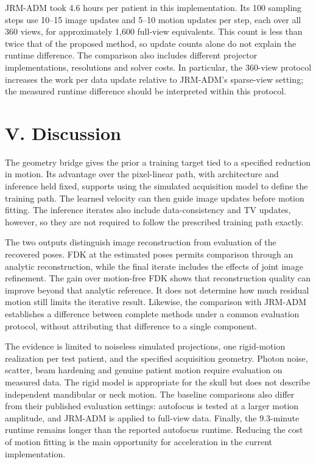 \documentclass[11pt]{article}
\begin{document}
JRM-ADM took 4.6 hours per patient in this implementation. Its 100 sampling steps
use 10--15 image updates and 5--10 motion updates per step, each over all 360 views,
for approximately 1,600 full-view equivalents. This count is less than twice that of
the proposed method, so update counts alone do not explain the runtime difference.
The comparison also includes different projector implementations, resolutions and
solver costs. In particular, the 360-view protocol increases the work per data update
relative to JRM-ADM's sparse-view setting; the measured runtime difference should be
interpreted within this protocol.

\FloatBarrier
\section{V. Discussion}


The geometry bridge gives the prior a training target tied to a specified reduction in
motion. Its advantage over the pixel-linear path, with architecture and inference held
fixed, supports using the simulated acquisition model to define the training path.
The learned velocity can then guide image updates before motion fitting. The inference
iterates also include data-consistency and TV updates, however, so they are not required
to follow the prescribed training path exactly.

The two outputs distinguish image reconstruction from evaluation of the recovered poses.
FDK at the estimated poses permits comparison through an analytic reconstruction,
while the final iterate includes the effects of joint image refinement. The gain over
motion-free FDK shows that reconstruction quality can improve beyond that analytic
reference. It does not determine how much residual motion still limits the iterative
result. Likewise, the comparison with JRM-ADM establishes a difference between complete
methods under a common evaluation protocol, without attributing that difference to a
single component.

The evidence is limited to noiseless simulated projections, one rigid-motion realization
per test patient, and the specified acquisition geometry. Photon noise, scatter, beam
hardening and genuine patient motion require evaluation on measured data. The rigid
model is appropriate for the skull but does not describe independent mandibular or neck
motion. The baseline comparisons also differ from their published evaluation settings:
autofocus is tested at a larger motion amplitude, and JRM-ADM is applied to full-view
data. Finally, the 9.3-minute runtime remains longer than the reported autofocus runtime.
Reducing the cost of motion fitting is the main opportunity for acceleration in the
current implementation.
\end{document}
